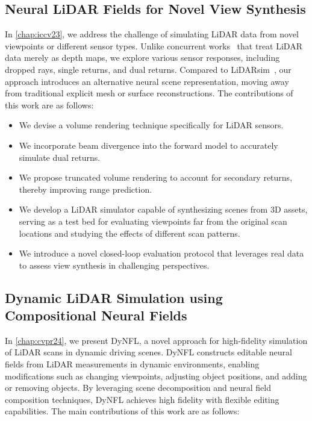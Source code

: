 \subsection{Neural LiDAR Fields for Novel View Synthesis}
In \cref{chap:iccv23}, we address the challenge of simulating LiDAR data from novel viewpoints or different sensor types. Unlike concurrent works~\cite{zhang2023nerflidar,tao2023lidarnerf} that treat LiDAR data merely as depth maps, we explore various sensor responses, including dropped rays, single returns, and dual returns. Compared to LiDARsim~\cite{manivasagam2020lidarsim}, our approach introduces an alternative neural scene representation, moving away from traditional explicit mesh or surface reconstructions. The contributions of this work are as follows:

\begin{itemize}
\item We devise a volume rendering technique specifically for LiDAR sensors.
\item We incorporate beam divergence into the forward model to accurately simulate dual returns.
\item We propose truncated volume rendering to account for secondary returns, thereby improving range prediction.
\item We develop a LiDAR simulator capable of synthesizing scenes from 3D assets, serving as a test bed for evaluating viewpoints far from the original scan locations and studying the effects of different scan patterns.
\item We introduce a novel closed-loop evaluation protocol that leverages real data to assess view synthesis in challenging perspectives.
\end{itemize}


\subsection{Dynamic LiDAR Simulation using Compositional Neural Fields}
In \cref{chap:cvpr24}, we present DyNFL, a novel approach for high-fidelity simulation of LiDAR scans in dynamic driving scenes. DyNFL constructs editable neural fields from LiDAR measurements in dynamic environments, enabling modifications such as changing viewpoints, adjusting object positions, and adding or removing objects. By leveraging scene decomposition and neural field composition techniques, DyNFL achieves high fidelity with flexible editing capabilities. The main contributions of this work are as follows:


